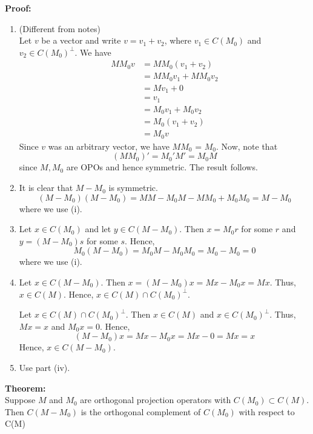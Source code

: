 \documentclass[12pt]{article}
\numberwithin{equation}{section}
\begin{document}
\textbf{Proof:}
\begin{enumerate}
 \item (Different from notes) \\
 Let $v$ be a vector and write $v = v_1 + v_2$, where $v_1 \in C(M_0)$ and $v_2 \in C(M_0)^{\perp}$. We have
 \begin{align*}
   M M_0 v &= M M_0(v_1 + v_2) \\
     &= M M_0 v_1 + M M_0 v_2 \\
     &= M v_1 + 0 \\
     &= v_1 \\
     &= M_0 v_1 + M_0 v_2 \\
     &= M_0(v_1 + v_2) \\
     &= M_0 v
 \end{align*}
 Since $v$ was an arbitrary vector, we have $M M_0$ = $M_0$. Now, note that
 \begin{equation*}
   (M M_0)' = M_0' M' = M_0 M
 \end{equation*}
 since $M, M_0$ are OPOs and hence symmetric. The result follows.
%
  \item It is clear that $M - M_0$ is symmetric.
  \begin{equation*}
    (M - M_0)(M - M_0) = MM - M_0 M - M M_0 + M_0 M_0 = M - M_0
  \end{equation*}
  where we use (i).
%
  \item Let $x \in C(M_0)$ and let $y \in C(M - M_0)$. Then $x = M_0 r$ for some $r$ and $y = (M - M_0)s$ for some $s$. Hence,
  \begin{equation}
    M_0(M - M_0) = M_0 M - M_0 M_0 = M_0 - M_0 = 0
  \end{equation}
  where we use (i).
  \item Let $x \in C(M - M_0)$. Then $x = (M - M_0)x = Mx - M_0x = Mx$. Thus, $x \in C(M)$. Hence, $x \in C(M) \cap C(M_0)^{\perp}$.
  
  Let $x \in C(M) \cap C(M_0)^{\perp}$. Then $x \in C(M)$ and $x \in C(M_0)^\perp$. Thus, $Mx = x$ and $M_0 x = 0$. Hence,
  \begin{equation*}
    (M - M_0) x = Mx - M_0 x = Mx - 0 = Mx = x
  \end{equation*}
  Hence, $x \in C(M - M_0)$.
  \item Use part (iv).
\end{enumerate}

\textbf{Theorem:} \\
Suppose $M$ and $M_0$ are orthogonal projection operators with $C(M_0) \subset C(M)$. Then $C(M - M_0)$ is the orthogonal complement of $C(M_0)$ with respect to C(M)
\end{document}
